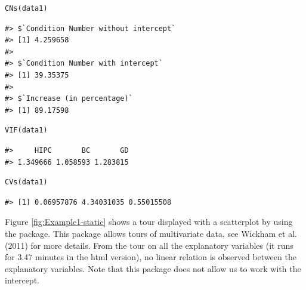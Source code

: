 \begin{verbatim}
CNs(data1)
\end{verbatim}

\begin{verbatim}
#> $`Condition Number without intercept`
#> [1] 4.259658
#> 
#> $`Condition Number with intercept`
#> [1] 39.35375
#> 
#> $`Increase (in percentage)`
#> [1] 89.17598
\end{verbatim}

\begin{verbatim}
VIF(data1)
\end{verbatim}

\begin{verbatim}
#>     HIPC       BC       GD 
#> 1.349666 1.058593 1.283815
\end{verbatim}

\begin{verbatim}
CVs(data1)
\end{verbatim}

\begin{verbatim}
#> [1] 0.06957876 4.34031035 0.55015508
\end{verbatim}

Figure \ref{fig:Example1-static} shows a tour displayed with a scatterplot by using the  package. This package allows tours of multivariate data, see Wickham et al. (2011) for more details. From the tour on all the explanatory variables (it runs for 3.47 minutes in the html version), no linear relation is observed between the explanatory variables. Note that this package does not allow us to work with the intercept.

